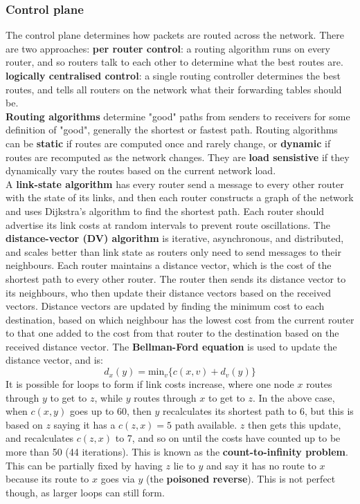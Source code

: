 \subsubsection{Control plane}
The control plane determines how packets are routed across the network. There are two approaches: \textbf{per router control}: a routing algorithm runs on every router, and so routers talk to each other to determine what the best routes are. \textbf{logically centralised control}: a single routing controller determines the best routes, and tells all routers on the network what their forwarding tables should be.\\
\textbf{Routing algorithms} determine "good" paths from senders to receivers for some definition of "good", generally the shortest or fastest path. Routing algorithms can be \textbf{static} if routes are computed once and rarely change, or \textbf{dynamic} if routes are recomputed as the network changes. They are \textbf{load sensistive} if they dynamically vary the routes based on the current network load.\\
A \textbf{link-state algorithm} has every router send a message to every other router with the state of its links, and then each router constructs a graph of the network and uses Dijkstra's algorithm to find the shortest path. Each router should advertise its link costs at random intervals to prevent route oscillations. The \textbf{distance-vector (DV) algorithm} is iterative, asynchronous, and distributed, and scales better than link state as routers only need to send messages to their neighbours. Each router maintains a distance vector, which is the cost of the shortest path to every other router. The router then sends its distance vector to its neighbours, who then update their distance vectors based on the received vectors. Distance vectors are updated by finding the minimum cost to each destination, based on which neighbour has the lowest cost from the current router to that one added to the cost from that router to the destination based on the received distance vector. The \textbf{Bellman-Ford equation} is used to update the distance vector, and is:
$$
	d_x(y)=\text{min}_v\{c(x,v)+d_v(y)\}
$$
It is possible for loops to form if link costs increase, where one node $x$ routes through $y$ to get to $z$, while $y$ routes through $x$ to get to $z$. In the above case, when $c(x,y)$ goes up to 60, then $y$ recalculates its shortest path to 6, but this is based on $z$ saying it has a $c(z,x)=5$ path available. $z$ then gets this update, and recalculates $c(z,x)$ to 7, and so on until the costs have counted up to be more than 50 (44 iterations). This is known as the \textbf{count-to-infinity problem}. This can be partially fixed by having $z$ lie to $y$ and say it has no route to $x$ because its route to $x$ goes via $y$ (the \textbf{poisoned reverse}). This is not perfect though, as larger loops can still form.\\

